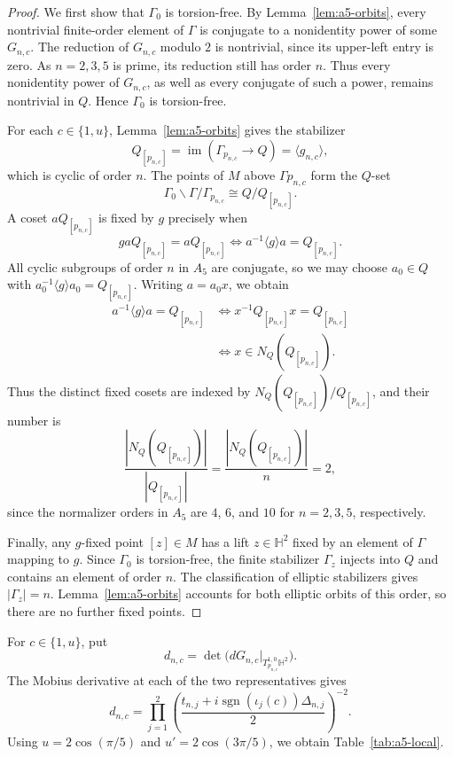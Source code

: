 \documentclass[11pt]{article}
\theoremstyle{definition}
\theoremstyle{plain}
\numberwithin{equation}{section}
\newcommand{\HH}{\mathbb H}
\begin{document}
\begin{proof}
We first show that $\Gamma_0$ is torsion-free.
By Lemma~\ref{lem:a5-orbits}, every nontrivial
finite-order element of $\Gamma$ is conjugate
to a nonidentity power of some $G_{n,c}$.
The reduction of $G_{n,c}$ modulo $2$ is
nontrivial, since its upper-left entry
is zero.
As $n=2,3,5$ is prime, its reduction
still has order $n$.
Thus every nonidentity power of
$G_{n,c}$, as well as every conjugate
of such a power, remains nontrivial
in $Q$. Hence $\Gamma_0$ is torsion-free.

For each $c\in\{1,u\}$, Lemma~\ref{lem:a5-orbits}
gives the stabilizer
\[
Q_{[p_{n,c}]}
=\operatorname{im}(\Gamma_{p_{n,c}}\to Q)
=\langle g_{n,c}\rangle,
\]
which is cyclic of order $n$.
The points of $M$ above $\Gamma p_{n,c}$
form the $Q$-set
\[
\Gamma_0\backslash\Gamma/\Gamma_{p_{n,c}}
\cong Q/Q_{[p_{n,c}]}.
\]
A coset $aQ_{[p_{n,c}]}$ is fixed by $g$
precisely when
\begin{equation}\label{eq:a5-coset-count}
gaQ_{[p_{n,c}]}=aQ_{[p_{n,c}]}
\iff
a^{-1}\langle g\rangle a=Q_{[p_{n,c}]}.
\end{equation}
All cyclic subgroups of order $n$ in $A_5$
are conjugate, so we may choose $a_0\in Q$
with $a_0^{-1}\langle g\rangle a_0=Q_{[p_{n,c}]}$.
Writing $a=a_0x$, we obtain
\[
\begin{aligned}
a^{-1}\langle g\rangle a=Q_{[p_{n,c}]}
&\iff x^{-1}Q_{[p_{n,c}]}x=Q_{[p_{n,c}]}\\
&\iff x\in N_Q(Q_{[p_{n,c}]}).
\end{aligned}
\]
Thus the distinct fixed cosets are
indexed by
$N_Q(Q_{[p_{n,c}]})/Q_{[p_{n,c}]}$,
and their number is
\[
\frac{|N_Q(Q_{[p_{n,c}]})|}
{|Q_{[p_{n,c}]}|}
=\frac{|N_Q(Q_{[p_{n,c}]})|}{n}=2,
\]
since the normalizer orders in $A_5$
are $4$, $6$, and $10$ for
$n=2,3,5$, respectively.

Finally, any $g$-fixed point $[z]\in M$
has a lift $z\in\HH^2$ fixed by an
element of $\Gamma$ mapping to $g$.
Since $\Gamma_0$ is torsion-free,
the finite stabilizer $\Gamma_z$
injects into $Q$ and contains an
element of order $n$.
The classification of elliptic
stabilizers gives $|\Gamma_z|=n$.
Lemma~\ref{lem:a5-orbits} accounts
for both elliptic orbits of this
order, so there are no further
fixed points.
\end{proof}

For $c\in\{1,u\}$, put
\[
d_{n,c}=
\det\bigl(
dG_{n,c}|_{T^{1,0}_{p_{n,c}}\HH^2}
\bigr).
\]
The Mobius derivative at each of the
two representatives gives
\begin{equation}\label{eq:a5-derivative}
d_{n,c}
=\prod_{j=1}^2
\left(
\frac{t_{n,j}
+i\operatorname{sgn}(\iota_j(c))
\Delta_{n,j}}{2}
\right)^{-2}.
\end{equation}
Using $u=2\cos(\pi/5)$ and
$u'=2\cos(3\pi/5)$, we obtain
Table~\ref{tab:a5-local}.
\end{document}
